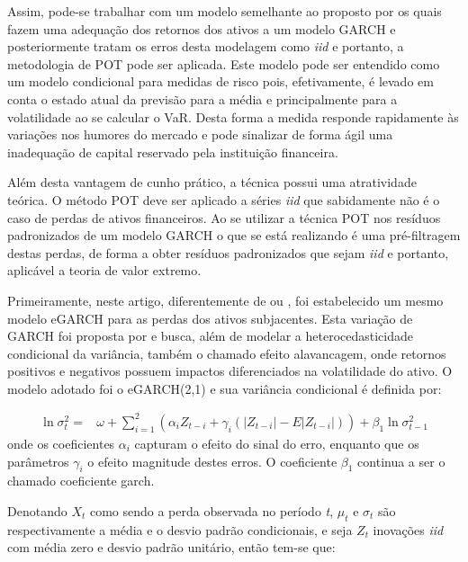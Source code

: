 \documentclass[1p]{elsarticle}
\theoremstyle{definition}
\begin{document}
Assim, pode-se trabalhar com um modelo semelhante ao proposto por \cite{McNeil2000} os quais fazem uma adequação dos retornos dos ativos a um modelo GARCH e posteriormente tratam os erros desta modelagem como \emph{iid} e portanto, a metodologia de POT pode ser aplicada. Este modelo pode ser entendido como um modelo condicional para medidas de risco pois, efetivamente, é levado em conta o estado atual da previsão para a média e principalmente para a volatilidade ao se calcular o VaR. Desta forma a medida responde rapidamente às variações nos humores do mercado e pode sinalizar de forma ágil uma inadequação de capital reservado pela instituição financeira.

Além desta vantagem de cunho prático, a técnica possui uma atratividade teórica. O método POT deve ser aplicado a séries \emph{iid} que sabidamente não é o caso de perdas de ativos financeiros. Ao se utilizar a técnica POT nos resíduos padronizados de um modelo GARCH o que se está realizando é uma pré-filtragem destas perdas, de forma a obter resíduos padronizados que sejam \emph{iid} e portanto, aplicável a teoria de valor extremo. 

Primeiramente, neste artigo, diferentemente de \cite{McNeil2000} ou \cite{Karmakar2014}, foi estabelecido um mesmo modelo eGARCH para as perdas dos ativos subjacentes. Esta variação de GARCH foi proposta por \cite{Nelson1991} e busca, além de modelar a heterocedasticidade condicional da variância, também o chamado efeito alavancagem, onde retornos positivos e negativos possuem impactos diferenciados na volatilidade do ativo. O modelo adotado foi o eGARCH(2,1) e sua variância condicional é definida por:

\begin{align}
\label{eq:egarch}
\ln\sigma_t^2=&\omega+ \sum_{i=1}^{2}\left(\alpha_i Z_{t-i}+ \gamma_i(|Z_{t-i}|-E|Z_{t-i}|)\right)+ \beta_1 \ln\sigma_{t-1}^2
\end{align}
onde os coeficientes $\alpha_i$ capturam o efeito do sinal do erro, enquanto que os parâmetros $\gamma_i$ o efeito magnitude destes erros. O coeficiente $\beta_1$ continua a ser o chamado coeficiente garch. %


Denotando $X_t$ como sendo a perda observada no período \emph{t}, $\mu_t$ e $\sigma_t$ são respectivamente a média e o desvio padrão condicionais, e seja $Z_t$ inovações \emph{iid} com média zero e desvio padrão unitário, então tem-se que:
\end{document}
